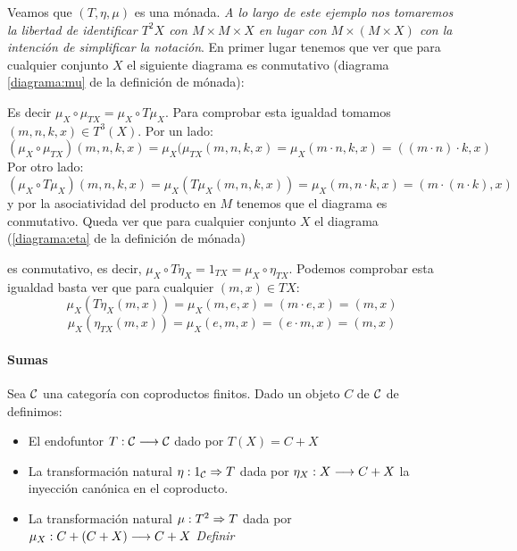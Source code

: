 Veamos que $(T, \eta, \mu)$ es una mónada.
\textit{A lo largo de este ejemplo nos tomaremos la libertad de identificar $T^2X$ con $M\times M\times X$ en lugar con $M \times (M\times X)$ con la intención de simplificar la notación}.
En primer lugar
tenemos que ver que para cualquier conjunto $X$ el siguiente
diagrama es conmutativo (diagrama \eqref{diagrama:mu} de la definición
de mónada):
\begin{center}
\end{center}
Es decir $\mu_X \circ \mu_{TX} = \mu_X \circ T\mu_X$. Para comprobar
esta igualdad tomamos $(m, n, k, x) \in T^3(X)$.
Por un lado:
$$(\mu_X \circ \mu_{TX})(m, n, k, x) = \mu_X(\mu_{TX}(m, n, k, x)
  = \mu_X(m\cdot n, k, x) = ((m\cdot n)\cdot k, x)$$
Por otro lado:
$$(\mu_X \circ T\mu_X)(m, n, k, x) = \mu_X(T\mu_X(m, n, k, x))
  = \mu_X(m, n\cdot k, x) = (m \cdot (n\cdot k), x)$$
y por la asociatividad del producto en $M$ tenemos que
el diagrama es conmutativo.
Queda ver que para cualquier conjunto $X$ el diagrama
(\ref{diagrama:eta} de la definición de mónada)
\begin{center}
\end{center}
es conmutativo, es decir, $\mu_X \circ T\eta_X = 1_{TX} = \mu_X \circ \eta_{TX}$. Podemos
comprobar esta igualdad basta ver que para cualquier $(m, x) \in TX$:
$$\mu_X(T\eta_X(m, x)) = \mu_X(m, e, x) = (m \cdot e, x) = (m, x)$$
$$\mu_X(\eta_{TX}(m, x)) = \mu_X(e, m, x) = (e\cdot m, x) = (m, x)$$

\paragraph{Sumas}
Sea $\mathcal{C}$ una categoría con coproductos finitos. Dado un objeto
$C$ de $\mathcal{C}$ de definimos:

\begin{itemize}
\item El endofuntor $T: \mathcal{C}\longrightarrow \mathcal{C}$ dado por $T(X) = C + X$
\item La transformación natural $\eta : 1_{\mathcal{C}}\Rightarrow T$ dada por
  $\eta_X : X\longrightarrow C+X$ la inyección canónica en el coproducto.
\item La transformación natural $\mu: T^2\Rightarrow T$ dada por
  $\mu_X : C + (C + X)\longrightarrow C + X$ \textit{Definir}
\end{itemize}

